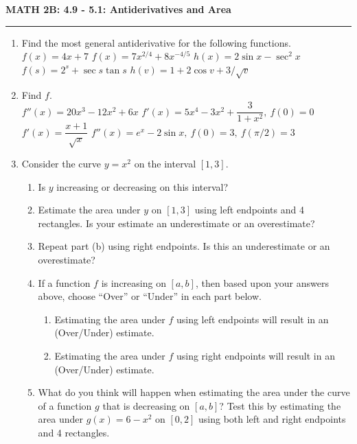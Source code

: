 \documentclass[12pt]{article}
\begin{document}
\begin{center}
{\bf \Large MATH 2B: 4.9 - 5.1: Antiderivatives and Area}
\vspace{0.2cm}
\hrule
\end{center}

\begin{enumerate}
	\item Find the most general antiderivative for the following functions.\\
	$f(x) = 4x+7$\hspace{2cm} $f(x) = 7x^{2/4}+8x^{-4/5}$\hspace{2cm} $h(x) = 2\sin x - \sec^2x$
	\vfill
	$f(s) = 2^s + \sec s \tan s$ \hspace{2cm} $h(v) = 1 + 2\cos v + 3/\sqrt{v}$
	\vfill
	\item Find $f$.\\
	$f''(x) = 20x^3 - 12x^2 + 6x$ \hspace{2cm} $f'(x) = 5x^4 - 3x^2 + \dfrac{3}{1+x^2},\ f(0) = 0$
	\vfill
	$f'(x) = \dfrac{x+1}{\sqrt{x}}$\hspace{2cm} $f''(x) = e^x - 2\sin x,\ f(0) = 3,\ f(\pi/2) = 3$
	\vfill
	\pagebreak

	\item Consider the curve $y = x^2$ on the interval $[1,3]$.
	\begin{enumerate}
		\item Is $y$ increasing or decreasing on this interval?
		\vspace{1cm}
		\item Estimate the area under $y$ on $[1,3]$ using left endpoints and 4 rectangles. Is your estimate an underestimate or an overestimate?
		\vfill
		\item Repeat part (b) using right endpoints. Is this an underestimate or an overestimate?
		\vfill
		\item If a function $f$ is increasing on $[a,b]$, then based upon your answers above, choose ``Over'' or ``Under'' in each part below.
		\begin{enumerate}
			\item Estimating the area under $f$ using left endpoints will result in an (Over/Under) estimate.
			\item Estimating the area under $f$ using right endpoints will result in an (Over/Under) estimate.
		\end{enumerate}
		\item What do you think will happen when estimating the area under the curve of a function $g$ that is decreasing on $[a,b]$? Test this by estimating the area under $g(x) = 6-x^2$ on $[0,2]$ using both left and right endpoints and 4 rectangles.
		\vfill
	\end{enumerate}
\end{enumerate}
\end{document}

